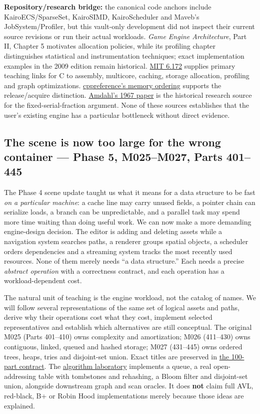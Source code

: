 \textbf{Repository/research bridge:} the canonical code anchors include KairoECS/SparseSet, KairoSIMD, KairoScheduler and Maveb's JobSystem/Profiler, but this vault-only development did not inspect their current source revisions or run their actual workloads. \emph{Game Engine Architecture}, Part II, Chapter 5 motivates allocation policies, while its profiling chapter distinguishes statistical and instrumentation techniques; exact implementation examples in the 2009 edition remain historical. \href{https://ocw.mit.edu/courses/6-172-performance-engineering-of-software-systems-fall-2018/video_galleries/lecture-videos/}{MIT 6.172} supplies primary teaching links for C to assembly, multicore, caching, storage allocation, profiling and graph optimizations. \href{https://en.cppreference.com/w/cpp/atomic/memory_order}{cppreference's memory ordering} supports the release/acquire distinction. \href{https://doi.org/10.1145/1465482.1465560}{Amdahl's 1967 paper} is the historical research source for the fixed-serial-fraction argument. None of these sources establishes that the user's existing engine has a particular bottleneck without direct evidence.

\subsection{The scene is now too large for the wrong container --- Phase 5, M025--M027, Parts 401--445}\label{the-scene-is-now-too-large-for-the-wrong-container-phase-5-m025m027-parts-401445}

The Phase 4 scene update taught us what it means for a data structure to be fast \emph{on a particular machine}: a cache line may carry unused fields, a pointer chain can serialize loads, a branch can be unpredictable, and a parallel task may spend more time waiting than doing useful work. We can now make a more demanding engine-design decision. The editor is adding and deleting assets while a navigation system searches paths, a renderer groups spatial objects, a scheduler orders dependencies and a streaming system tracks the most recently used resources. None of them merely needs ``a data structure.'' Each needs a precise \emph{abstract operation} with a correctness contract, and each operation has a workload-dependent cost.

The natural unit of teaching is the engine workload, not the catalog of names. We will follow several representations of the same set of logical assets and paths, derive why their operations cost what they cost, implement selected representatives and establish which alternatives are still conceptual. The original M025 (Parts 401--410) owns complexity and amortization; M026 (411--430) owns contiguous, linked, queued and hashed storage; M027 (431--445) owns ordered trees, heaps, tries and disjoint-set union. Exact titles are preserved in \hyperref[appendix-fd090d982a15]{the 100-part contract}. The \href{tools/labs/phase5_algorithm_workload_lab.cpp}{algorithm laboratory} implements a queue, a real open-addressing table with tombstones and rehashing, a Bloom filter and disjoint-set union, alongside downstream graph and scan oracles. It does \textbf{not} claim full AVL, red-black, B+ or Robin Hood implementations merely because those ideas are explained.

